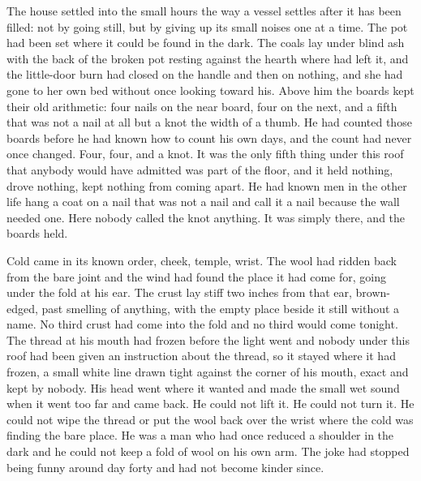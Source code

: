 The house settled into the small hours the way a vessel settles after it has been filled: not by going still, but by giving up its small noises one at a time. The pot had been set where it could be found in the dark. The coals lay under blind ash with the back of the broken pot resting against the hearth where  had left it, and the little-door burn had closed on the handle and then on nothing, and she had gone to her own bed without once looking toward his. Above him the boards kept their old arithmetic: four nails on the near board, four on the next, and a fifth that was not a nail at all but a knot the width of a thumb. He had counted those boards before he had known how to count his own days, and the count had never once changed. Four, four, and a knot. It was the only fifth thing under this roof that anybody would have admitted was part of the floor, and it held nothing, drove nothing, kept nothing from coming apart. He had known men in the other life hang a coat on a nail that was not a nail and call it a nail because the wall needed one. Here nobody called the knot anything. It was simply there, and the boards held.

Cold came in its known order, cheek, temple, wrist. The wool had ridden back from the bare joint and the wind had found the place it had come for, going under the fold at his ear. The crust lay stiff two inches from that ear, brown-edged, past smelling of anything, with the empty place beside it still without a name. No third crust had come into the fold and no third would come tonight. The thread at his mouth had frozen before the light went and nobody under this roof had been given an instruction about the thread, so it stayed where it had frozen, a small white line drawn tight against the corner of his mouth, exact and kept by nobody. His head went where it wanted and made the small wet sound when it went too far and came back. He could not lift it. He could not turn it. He could not wipe the thread or put the wool back over the wrist where the cold was finding the bare place. He was a man who had once reduced a shoulder in the dark and he could not keep a fold of wool on his own arm. The joke had stopped being funny around day forty and had not become kinder since.

